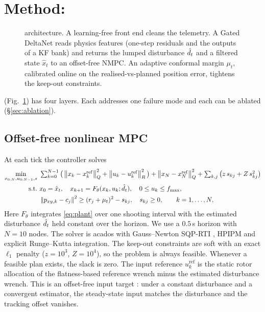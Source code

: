 \section{Method: \ours{}}
\label{sec:method}

\begin{figure}[t]
  \centering
  \resizebox{0.98\linewidth}{!}{}
  \caption{\ours{} architecture. A learning-free front end cleans the telemetry. A Gated DeltaNet reads physics features (one-step residuals and the outputs of a KF bank) and returns the lumped disturbance $\hat d_t$ and a filtered state $\hat x_t$ to an offset-free NMPC. An adaptive conformal margin $\mu_t$, calibrated online on the realised-vs-planned position error, tightens the keep-out constraints.}
  \label{fig:architecture}
\end{figure}

\ours{} (Fig.~\ref{fig:architecture}) has four layers. Each addresses one failure mode and each can be ablated (\S\ref{sec:ablation}).

\subsection{Offset-free nonlinear MPC}
\label{sec:nmpc}
At each tick the controller solves
\begin{equation}
\begin{aligned}
  \min_{x_{0:N},u_{0:N-1},s}\ & \textstyle\sum_{k=0}^{N-1}\big(\left\lVert x_k-x^{\mathrm{ref}}_k \right\rVert_Q^2+\left\lVert u_k-u^{\mathrm{ref}}_k \right\rVert_R^2\big)+\left\lVert x_N-x^{\mathrm{ref}}_N \right\rVert_Q^2+\sum_{k,j}\big(z\,s_{kj}+Z\,s_{kj}^2\big)\\
  \text{s.t.}\ & x_0=\hat x_t,\quad x_{k+1}=F_{\theta}(x_k,u_k;\hat d_t),\quad 0\le u_k\le f_{\max},\\
  & \left\lVert p_{xy,k}-c_j \right\rVert^2 \ge (r_j+\mu_t)^2 - s_{kj},\quad s_{kj}\ge 0,\qquad k=1,\dots,N,
\end{aligned}
\label{eq:ocp}
\end{equation}
Here $F_\theta$ integrates \eqref{eq:plant} over one shooting interval with the estimated disturbance $\hat d_t$ held constant over the horizon.
We use a $0.5$\,s horizon with $N=10$ nodes. The solver is acados \citep{verschueren2022acados} with Gauss--Newton SQP-RTI \citep{diehl2005rti}, HPIPM \citep{frison2020hpipm} and explicit Runge--Kutta integration.
The keep-out constraints are soft with an exact $\ell_1$ penalty \citep{kerrigan2000soft} ($z{=}10^3$, $Z{=}10^4$), so the problem is always feasible. Whenever a feasible plan exists, the slack is zero.
The input reference $u^{\mathrm{ref}}_k$ is the static rotor allocation of the flatness-based reference wrench minus the estimated disturbance wrench. This is an offset-free input target \citep{pannocchia2003disturbance,maeder2009linear}: under a constant disturbance and a convergent estimator, the steady-state input matches the disturbance and the tracking offset vanishes.

